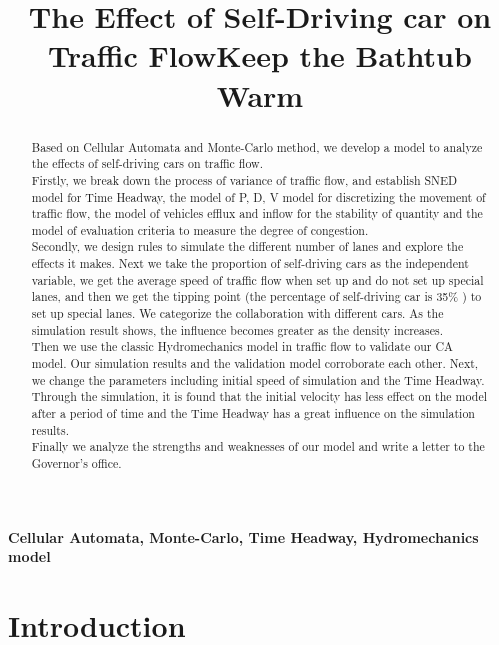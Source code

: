 \documentclass{mcmthesis}
\title{The Effect of Self-Driving car on Traffic Flow}
\date{}
\begin{document}
\begin{abstract}%


\title{Keep the Bathtub Warm}
Based on Cellular Automata and Monte-Carlo method, we develop a model to analyze the effects of self-driving cars on traffic flow.\\
\indent Firstly, we break down the process of variance of traffic flow, and establish SNED model for Time Headway, the model of P, D, V model for discretizing the movement of traffic flow, the model of vehicles efflux and inflow for the stability of quantity and the model of evaluation criteria to measure the degree of congestion.\\
\indent Secondly, we design rules to simulate the different number of lanes and explore the effects it makes. Next we take the proportion of self-driving cars as the independent variable, we get the  average speed of traffic flow when set up and do not set up special lanes, and then we get the tipping point (the percentage of self-driving car is 35\% ) to set up special lanes. We categorize the collaboration with different cars. As the simulation result shows, the influence becomes greater as the density increases.\\
\indent Then we use the classic Hydromechanics model in traffic flow to validate our CA model. Our simulation results and the validation model corroborate each other. Next, we change the parameters including initial speed of simulation and the Time Headway. Through the simulation, it is found that the initial velocity has less effect on the model after a period of time and the Time Headway has a great influence on the simulation results.  \\
\indent Finally we analyze the strengths and weaknesses of our model and write a letter to the Governor's office.
 


\end{abstract}

\begin{keywords}
	\textbf{Cellular Automata, Monte-Carlo, Time Headway,  Hydromechanics model}
\end{keywords}
\maketitle
\tableofcontents\thispagestyle{empty}
\newpage

\setcounter{page}{1}
\section{Introduction}
\end{document}
